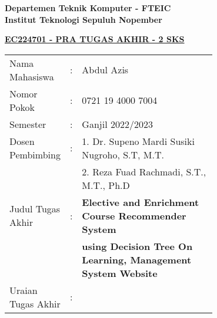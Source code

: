 \begin{flushleft}
  \textbf{Departemen Teknik Komputer - FTEIC}\\
  \textbf{Institut Teknologi Sepuluh Nopember}\\
\end{flushleft}

\begin{center}
  \underline{\textbf{EC224701 - PRA TUGAS AKHIR - 2 SKS}}
\end{center}

\begin{adjustwidth}{-0.2cm}{}
  \begin{tabular}{lcp{0.7\linewidth}}

    Nama Mahasiswa     & : & Abdul Azis                                                          \\
    Nomor Pokok        & : & 0721 19 4000 7004                                                   \\

    Semester           & : & Ganjil 2022/2023                                                    \\

    Dosen Pembimbing   & : & 1. Dr. Supeno Mardi Susiki Nugroho, S.T, M.T.                       \\
                       &   & 2. Reza Fuad Rachmadi, S.T., M.T., Ph.D                             \\
    Judul Tugas Akhir  & : & \textbf{Elective and Enrichment Course Recommender System}          \\
                       &   & \textbf{using Decision Tree On Learning, Management System Website} \\

    Uraian Tugas Akhir & : &                                                                     \\
  \end{tabular}
\end{adjustwidth}

